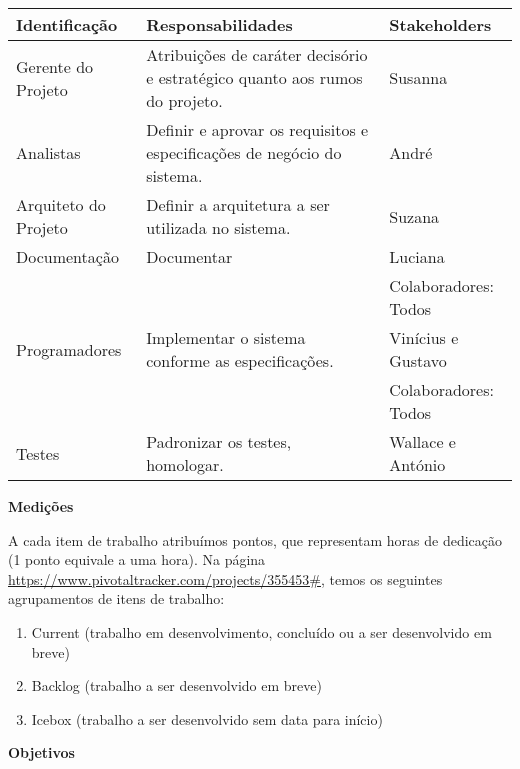 \documentclass[12pt,letterpaper]{article}
\begin{document}
\begin{table}[ht!]
\begin{small} %
    \begin{tabular}{| l | p{7cm} | p{5cm} |}
    \hline
    Identificação & Responsabilidades & Stakeholders\\
    \hline
    \hline
    Gerente do Projeto &
    Atribuições de caráter decisório e estratégico quanto aos rumos do projeto. &
    Susanna\\
    \hline
    Analistas &
    Definir e aprovar os requisitos e especificações de negócio do sistema. &
    André\\
    \hline
    Arquiteto do Projeto &
    Definir a arquitetura a ser utilizada no sistema. &
    Suzana\\
    \hline
    Documentação &
    Documentar &
    Luciana\\
    & & Colaboradores: Todos\\
    \hline
    Programadores &
    Implementar o sistema conforme as especificações. &
    Vinícius e Gustavo\\
    & & Colaboradores: Todos\\
    \hline
    Testes &
    Padronizar os testes, homologar. &
    Wallace e António\\
    \hline
    \end{tabular}
\end{small}
\end{table}

\vspace{1cm}
{\large {\bf Medições}}
\vspace{0.5cm}

A cada item de trabalho atribuímos pontos, que representam horas de dedicação (1 ponto equivale a uma hora).
Na página \url{https://www.pivotaltracker.com/projects/355453#}, temos os seguintes agrupamentos de itens de trabalho:
\begin{enumerate}
\item{Current (trabalho em desenvolvimento, concluído ou a ser desenvolvido em breve)}
\item{Backlog (trabalho a ser desenvolvido em breve)}
\item{Icebox (trabalho a ser desenvolvido sem data para início)}
\end{enumerate}

\vspace{1cm}
{\large {\bf Objetivos}}
\vspace{0.5cm}
\end{document}

